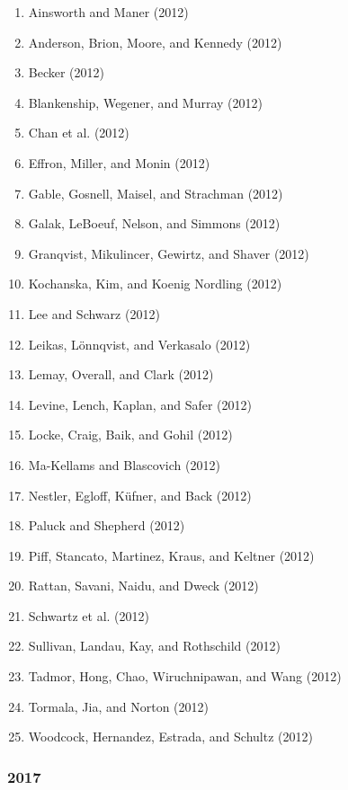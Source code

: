 \documentclass[english,man]{apa6}
\providecommand{\tightlist}{%
  \setlength{\itemsep}{0pt}\setlength{\parskip}{0pt}}
\theoremstyle{definition}
\theoremstyle{definition}
\theoremstyle{definition}
\theoremstyle{remark}
\begin{document}
\begin{enumerate}
\def\labelenumi{\arabic{enumi})}
\tightlist
\item
  Ainsworth and Maner (2012)
\item
  Anderson, Brion, Moore, and Kennedy (2012)
\item
  Becker (2012)
\item
  Blankenship, Wegener, and Murray (2012)
\item
  Chan et al. (2012)
\item
  Effron, Miller, and Monin (2012)
\item
  Gable, Gosnell, Maisel, and Strachman (2012)
\item
  Galak, LeBoeuf, Nelson, and Simmons (2012)
\item
  Granqvist, Mikulincer, Gewirtz, and Shaver (2012)
\item
  Kochanska, Kim, and Koenig Nordling (2012)
\item
  Lee and Schwarz (2012)
\item
  Leikas, Lönnqvist, and Verkasalo (2012)
\item
  Lemay, Overall, and Clark (2012)
\item
  Levine, Lench, Kaplan, and Safer (2012)
\item
  Locke, Craig, Baik, and Gohil (2012)
\item
  Ma-Kellams and Blascovich (2012)
\item
  Nestler, Egloff, Küfner, and Back (2012)
\item
  Paluck and Shepherd (2012)
\item
  Piff, Stancato, Martinez, Kraus, and Keltner (2012)
\item
  Rattan, Savani, Naidu, and Dweck (2012)
\item
  Schwartz et al. (2012)
\item
  Sullivan, Landau, Kay, and Rothschild (2012)
\item
  Tadmor, Hong, Chao, Wiruchnipawan, and Wang (2012)
\item
  Tormala, Jia, and Norton (2012)
\item
  Woodcock, Hernandez, Estrada, and Schultz (2012)
\end{enumerate}

\subsubsection{2017}\label{section-49}
\end{document}

